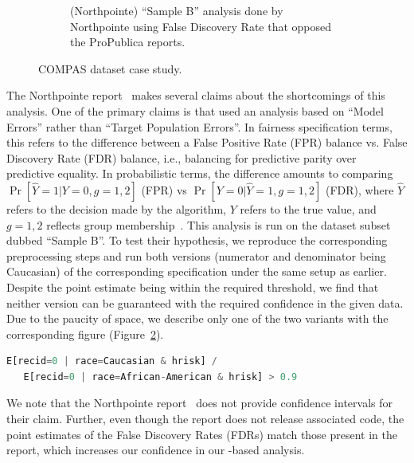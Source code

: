\begin{figure}
\begin{subfigure}{0.6\linewidth}
        \caption{(Northpointe) ``Sample B'' analysis done by Northpointe using False Discovery Rate that opposed the ProPublica reports.}
        \label{fig:casestudy:compas:northpointe}
    \end{subfigure}
    \caption{COMPAS dataset case study.}
\end{figure}


The Northpointe report~\citep{dieterich2016compas} makes several claims about the shortcomings of this analysis.
One of the primary claims is that \citet{angwin2016machine} used an analysis based on ``Model Errors'' rather than ``Target Population Errors''.
In fairness specification terms, this refers to the difference between a False Positive Rate (FPR) balance vs. False Discovery Rate (FDR) balance, i.e., balancing for predictive parity over predictive equality. 
In probabilistic terms, the difference amounts to comparing $\Pr[\hat{Y} = 1 | Y = 0, g=1, 2]$ (FPR) vs $\Pr[Y = 0 | \hat{Y} = 1, g=1, 2]$ (FDR), where $\hat{Y}$ refers to the decision made by the algorithm, $Y$ refers to the true value, and $g = 1, 2$ reflects group membership~\citep{verma2018fairness}.
This analysis is run on the dataset subset dubbed ``Sample B''.
To test their hypothesis, we reproduce the corresponding preprocessing steps and run both versions (numerator and denominator being Caucasian) of the corresponding specification under the same setup as earlier. 
Despite the point estimate being within the required threshold, we find that neither version can be guaranteed with the required confidence in the given data.
Due to the paucity of space, we describe only one of the two variants with the corresponding figure (Figure~\ref{fig:casestudy:compas:northpointe}).
\begin{lstlisting}[columns=flexible, language=Python]
   E[recid=0 | race=Caucasian & hrisk] /
   E[recid=0 | race=African-American & hrisk] > 0.9
\end{lstlisting}


We note that the Northpointe report~\citep{dieterich2016compas} does not provide confidence intervals for their claim. 
Further, even though the report does not release associated code, the point estimates of the False Discovery Rates (FDRs) match those present in the report, which increases our confidence in our \AVOIRmethodname{}-based analysis. 

